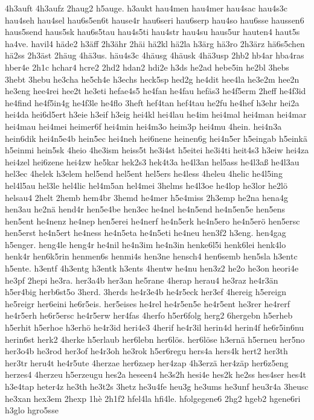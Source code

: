 {4h3auft
4h3aufz
2haug2
h5auge.
h3aukt
hau4men
hau4mer
hau4sac
hau4s3c
hau4seh
hau4sel
hau6s5en6t
hause4r
hau6seri
hau6serp
hau4so
hau6sse
haussen6
haus5send
haus5sk
hau6s5tau
hau4s5ti
hau4str
hau4su
haus5ur
hauten4
haut5s
ha4ve.
havil4
häde2
h3äff
2h3ähr
2häi
hä2kl
hä2la
h3ärg
hä3ro
2h3ärz
hä6s5chen
hä2ss
2h3äst
2häug
4hä3us.
häu4s3c
4häusg
4häusk
4hä3usp
2hb2
hb4ar
hba4ras
hber4e
2h1c
hchar4
hcre2
2hd2
hdan2
hdi2e
h3ds
he2ad
hebe5in
he2bl
3hebs
3hebt
3hebu
he3cha
he5ch4e
h3echs
heck5sp
hed2g
he4dit
hee4la
he3e2m
hee2n
he3eng
hee4rei
hee2t
he3eti
hefae4s5
he4fan
he4fau
hefäs3
he4f5erm
2heff
he4f3id
he4find
he4f5in4g
he4f3le
he4flo
3heft
hef4tan
hef4tau
he2fu
he4hef
h3ehr
hei2a
hei4da
hei6d5ert
h3eie
h3eif
h3eig
hei4kl
hei4lau
he4im
hei4mal
hei4man
hei4mar
hei4mau
hei4mei
heimer6f
hei4min
hei4m3o
heim3p
hei4mu
4hein.
hei4n3a
hein6dik
hei4n5e4b
hein5ec
hei4neh
hei6nene
heinen6g
hei4n5er
h5eingab
h5einkä
h5einmi
hein5sk
4heio
4he3ism
heiss5t
he3i4st
h5eitei
he3i4ti
heit4s3
h3eiw
hei4za
hei4zel
hei6zene
hei4zw
he5kar
hek2s3
hek4t3a
he4l3an
hel5ass
he4l3aß
he4l3au
hel3ec
4helek
h3elem
hel5end
hel5ent
hel5ers
he4less
4heleu
4helic
he4l5ing
hel4l5au
hel3le
hel4lic
hel4m5an
hel4mei
3helms
he4l3oe
he4lop
he3lor
he2lö
helsau4
2helt
2hemb
hem4br
3hemd
he4mer
h5e4miss
2h3emp
he2na
hena4g
hen3au
he2nä
hend4r
hen5e4be
hen3ec
he4nel
he4n5end
he4n5en5e
hen5ens
hen5ent
he4nenz
he4nep
hen5erei
he4nerf
he4n5erk
he4n5ero
he4n5erö
hen5ersc
hen5erst
he4n5ert
he4ness
he4n5eta
he4n5eti
he4neu
hen3f2
h3eng.
hen4gag
h5enger.
heng4le
heng4r
he4nil
he4n3im
he4n3in
henke6l5i
henk6lei
henk4lo
henk4r
hen6k5rin
henmen6s
henmi4s
hen3ne
hensch4
hen6semb
hen5sla
h3entc
h5ente.
h3entf
4h3entg
h3entk
h3ents
4hentw
he4nu
hen3z2
he2o
he3on
heori4e
he3pf
2hepi
he3ra.
her3a4b
her3an
he5rane
4herap
herau4
he3raz
he4r3än
h5er4big
herb6st5o
3herd.
3herds
he4r3e4b
he4r5eck
her3ef
4hereig
h5ereign
he5reigr
her6eini
he6r5eis.
her5eises
he4rel
he4r5en5e
he4r5ent
he3rer
he4rerf
he4r5erh
he6r5ersc
he4r5erw
her4fas
4herfo
h5er6folg
herg2
6hergebn
h5erheb
h5erhit
h5erhoe
h3erhö
he4r3id
heri4e3
4herif
he4r3il
herin4d
herin4f
he6r5in6nu
herin6st
herk2
4herke
h5erlaub
her6lebn
her6lös.
her6löse
h3ernä
h5erneu
her5no
her3o4b
he3rod
her3of
he4r3oh
he3rok
h5er6regu
hers4a
hers4k
hert2
her3th
her3tr
heru4t
he4r5ute
4herzae
her6zaep
her4zap
4h3erzä
her4zäp
her6z5eng
herzes4
4herzeu
h5erzeugu
hes2a
heseen4
he3s2h
hesi4e
hes2k
he2ss
hes4ser
hes4t
h3e4tap
heter4z
he3th
he3t2s
3hetz
he3u4fe
heu3g
he3ums
he3unf
heu3r4a
3heusc
he3xan
hex3em
2hexp
1hè
2h1f2
hfel4la
hfi4le.
hfolgegene6
2hg2
hgeb2
hgene6ri
h3glo
hgro5sse
}
